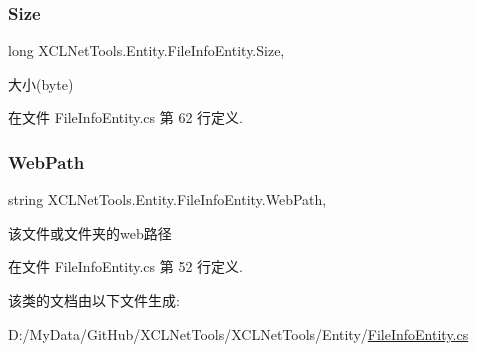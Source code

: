 \subsubsection{\texorpdfstring{Size}{Size}}
{\footnotesize\ttfamily long X\+C\+L\+Net\+Tools.\+Entity.\+File\+Info\+Entity.\+Size\hspace{0.3cm}{\ttfamily [get]}, {\ttfamily [set]}}



大小(byte) 



在文件 File\+Info\+Entity.\+cs 第 62 行定义.

\mbox{\label{class_x_c_l_net_tools_1_1_entity_1_1_file_info_entity_ab93bd802770bb40cc0abdfd35d2fbbc6}} 
\subsubsection{\texorpdfstring{Web\+Path}{WebPath}}
{\footnotesize\ttfamily string X\+C\+L\+Net\+Tools.\+Entity.\+File\+Info\+Entity.\+Web\+Path\hspace{0.3cm}{\ttfamily [get]}, {\ttfamily [set]}}



该文件或文件夹的web路径 



在文件 File\+Info\+Entity.\+cs 第 52 行定义.



该类的文档由以下文件生成\+:\begin{DoxyCompactItemize}
\item 
D\+:/\+My\+Data/\+Git\+Hub/\+X\+C\+L\+Net\+Tools/\+X\+C\+L\+Net\+Tools/\+Entity/\hyperlink{_file_info_entity_8cs}{File\+Info\+Entity.\+cs}\end{DoxyCompactItemize}
